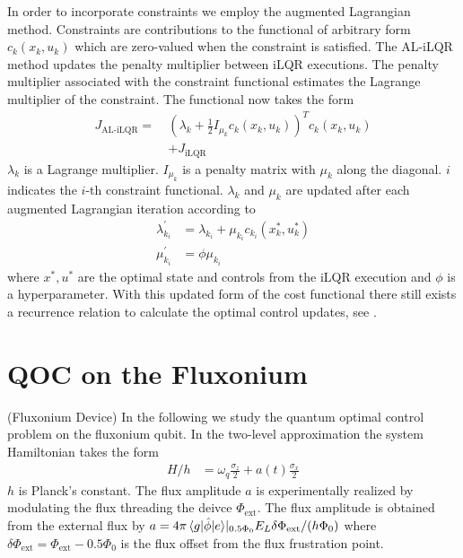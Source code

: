 \documentclass[
  amsfonts,
  amsmath,
  tbtags,
  amssymb,
  aps,
  nobibnotes,
  twocolumn,
]{revtex4-2}
\begin{document}
In order to incorporate constraints we employ
the augmented Lagrangian method. Constraints are contributions
to the functional of arbitrary form $c_{k}(x_{k}, u_{k})$ which are
zero-valued when the constraint is satisfied. The AL-iLQR
method updates the penalty multiplier between
iLQR executions. The penalty multiplier associated with the
constraint functional estimates the Lagrange multiplier of
the constraint. The functional now takes the form
\begin{equation}
  \begin{aligned}
    J_{\textrm{AL-iLQR}} = \ &(\lambda_{k} + \frac{1}{2}I_{\mu_{k}} c_{k}(x_{k}, u_{k}))^{T} c_{k}(x_{k}, u_{k})\\
    &+ J_{\textrm{iLQR}}
  \end{aligned}
\end{equation}
$\lambda_{k}$ is a Lagrange multiplier. $I_{\mu_{k}}$ is a penalty matrix
with $\mu_{k}$ along the diagonal. $i$ indicates the $i$-th constraint functional.
$\lambda_{k}$ and $\mu_{k}$ are updated after each augmented Lagrangian iteration according to
\begin{align}
  \lambda_{k_{i}}^{'} &= \lambda_{k_{i}} + \mu_{k_{i}} c_{k_{i}}(x_{k}^{*}, u_{k}^{*})\\
  \mu_{k_{i}}^{'} &= \phi \mu_{k_{i}}
\end{align}
where $x^{*}, u^{*}$ are the optimal state and controls from the iLQR execution
and $\phi$ is a hyperparameter. With this updated form of the cost
functional there still exists a recurrence relation to calculate the optimal control
updates, see \cite{howell2019altro}.

\section{QOC on the Fluxonium}
(Fluxonium Device) In the following we study
the quantum optimal control problem on the fluxonium qubit.
In the two-level
approximation the system Hamiltonian takes the form
\label{eq:hamiltonian}
\begin{align}
  H/h &= \omega_{q} \frac{\sigma_{z}}{2} + a(t) \frac{\sigma_{x}}{2}
\end{align}
$h$ is Planck's constant. The flux amplitude $a$ is experimentally
realized by modulating the flux 
threading the deivce $\Phi_{\textrm{ext}}$.
The flux amplitude is obtained from the external flux by
$a = 4 \pi \braket{g \lvert \hat{\phi} \rvert e} \rvert_{0.5 \Phi_{0}} E_{L}
\delta \Phi_{\textrm{ext}} / (h \Phi_{0})$
where $\delta \Phi_{\textrm{ext}} = \Phi_{\textrm{ext}} - 0.5 \Phi_{0}$ is the flux
offset from the flux frustration point.
\end{document}
